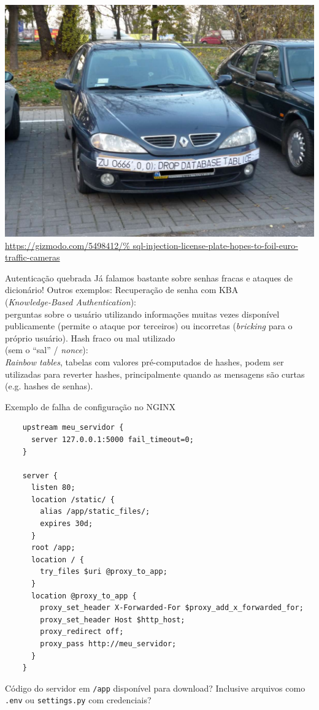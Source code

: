 \documentclass[utf8]{beamer}
\begin{document}
\begin{frame}
  \centering
  \includegraphics[width=\textwidth]{18mpenleoksq8jpg.jpg}
  \fontsize{10pt}{10pt}\selectfont
  \url{https://gizmodo.com/5498412/%
       sql-injection-license-plate-hopes-to-foil-euro-traffic-cameras}
\end{frame}


\begin{frame}{Autenticação quebrada}
  Já falamos bastante sobre senhas fracas e ataques de dicionário!
  \vfill
  Outros exemplos:
  \vfill
  \centering
  Recuperação de senha com KBA \\
  (\emph{Knowledge-Based Authentication}): \\
  perguntas sobre o usuário
  utilizando informações muitas vezes disponível publicamente
  (permite o ataque por terceiros)
  ou incorretas (\emph{bricking} para o próprio usuário).
  \vfill
  Hash fraco ou mal utilizado \\ (sem o ``sal'' / \emph{nonce}): \\
  \emph{Rainbow tables}, tabelas com valores pré-computados de hashes,
  podem ser utilizadas para reverter hashes,
  principalmente quando as mensagens são curtas
  (e.g. hashes de senhas).
\end{frame}


\begin{frame}[fragile]{Exemplo de falha de configuração no NGINX}
  \begin{verbatim}
    upstream meu_servidor {
      server 127.0.0.1:5000 fail_timeout=0;
    }

    server {
      listen 80;
      location /static/ {
        alias /app/static_files/;
        expires 30d;
      }
      root /app;
      location / {
        try_files $uri @proxy_to_app;
      }
      location @proxy_to_app {
        proxy_set_header X-Forwarded-For $proxy_add_x_forwarded_for;
        proxy_set_header Host $http_host;
        proxy_redirect off;
        proxy_pass http://meu_servidor;
      }
    }
  \end{verbatim}
  Código do servidor em \texttt{/app} disponível para download?
  Inclusive arquivos como \texttt{.env} ou \texttt{settings.py}
  com credenciais?
\end{frame}
\end{document}

